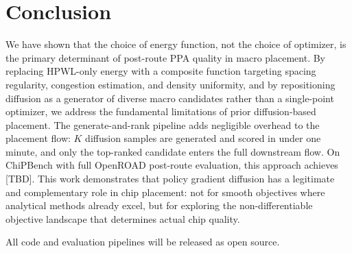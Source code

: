 \documentclass[sigconf,anonymous,review,9pt]{acmart}
\begin{document}
\section{Conclusion}
\label{sec:conclusion}

We have shown that the choice of energy function, not the choice of
optimizer, is the primary determinant of post-route PPA quality in macro
placement. By replacing HPWL-only energy with a composite function
targeting spacing regularity, congestion estimation, and density
uniformity, and by repositioning diffusion as a generator of diverse
macro candidates rather than a single-point optimizer, we address the
fundamental limitations of prior diffusion-based placement. The
generate-and-rank pipeline adds negligible overhead to the placement
flow: $K$ diffusion samples are generated and scored in under one
minute, and only the top-ranked candidate enters the full downstream
flow. On ChiPBench with full OpenROAD post-route evaluation, this
approach achieves [TBD]. This work demonstrates that policy gradient
diffusion has a legitimate and complementary role in chip placement: not
for smooth objectives where analytical methods already excel, but for
exploring the non-differentiable objective landscape that determines
actual chip quality.

All code and evaluation pipelines will be released as open source.




\end{document}
